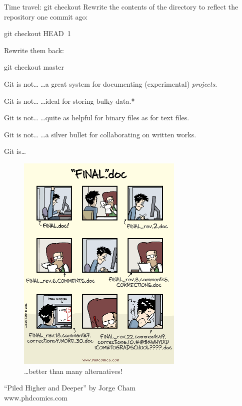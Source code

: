 \begin{frame}[fragile]{Time travel: git checkout}
  Rewrite the contents of the directory to reflect the repository one commit
  ago:

  \begin{gitCommand}git checkout HEAD~1\end{gitCommand}

  Rewrite them back:

  \begin{gitCommand}git checkout master\end{gitCommand}

\end{frame}

\begin{frame}{Git is not\ldots}
  \hangindent=26pt \huge {
  \ldots a great system for documenting (experimental) \emph{projects}.
  }
\end{frame}

\begin{frame}{Git is not\ldots}
  \hangindent=26pt \huge {
  \ldots ideal for storing bulky data.*
  }
\end{frame}

\begin{frame}{Git is not\ldots}
  \hangindent=26pt \huge {
  \ldots quite as helpful for binary files as for text files.
  }
\end{frame}

\begin{frame}{Git is not\ldots}
  \hangindent=26pt \huge {
  \ldots a silver bullet for collaborating on written works.
  }
\end{frame}

\begin{frame}{Git is\ldots}
  \begin{figure}
    \includegraphics[scale=0.5]{phd101212s.png}
    \\ \ldots better than many alternatives!
  \end{figure}
  \footnotesize{``Piled Higher and Deeper'' by Jorge Cham\\
    www.phdcomics.com}

\end{frame}


